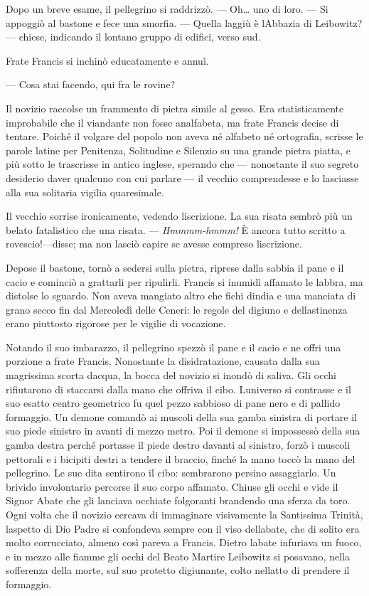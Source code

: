 Dopo un breve esame, il pellegrino si raddrizzò. --- Oh\ldots{} uno di
loro. --- Si appoggiò al bastone e fece una smorfia. --- Quella laggiù è
l\textquotesingle Abbazia di Leibowitz? --- chiese, indicando il lontano
gruppo di edifici, verso sud.

Frate Francis si inchinò educatamente e annuì.

--- Cosa stai facendo, qui fra le rovine?

Il novizio raccolse un frammento di pietra simile al gesso. Era
statisticamente improbabile che il viandante non fosse analfabeta, ma
frate Francis decise di tentare. Poiché il volgare del popolo non aveva
né alfabeto né ortografia, scrisse le parole latine per Penitenza,
Solitudine e Silenzio su una grande pietra piatta, e più sotto le
trascrisse in antico inglese, sperando che --- nonostante il suo segreto
desiderio d\textquotesingle aver qualcuno con cui parlare --- il vecchio
comprendesse e lo lasciasse alla sua solitaria vigilia quaresimale.

Il vecchio sorrise ironicamente, vedendo l\textquotesingle iscrizione.
La sua risata sembrò più un belato fatalistico che una risata. ---
\emph{Hmmmm-hmmm!} È ancora tutto scritto a rovescio!---disse; ma non
lasciò capire se avesse compreso l\textquotesingle iscrizione.

Depose il bastone, tornò a sedersi sulla pietra, riprese dalla sabbia il
pane e il cacio e cominciò a grattarli per ripulirli. Francis si inumidì
affamato le labbra, ma distolse lo sguardo. Non aveva mangiato altro che
fichi d\textquotesingle india e una manciata di grano secco fin dal
Mercoledì delle Ceneri: le regole del digiuno e
dell\textquotesingle astinenza erano piuttosto rigorose per le vigilie
di vocazione.

Notando il suo imbarazzo, il pellegrino spezzò il pane e il cacio e ne
offri una porzione a frate Francis. Nonostante la disidratazione,
causata dalla sua magrissima scorta d\textquotesingle acqua, la bocca
del novizio si inondò di saliva. Gli occhi rifiutarono di staccarsi
dalla mano che offriva il cibo. L\textquotesingle universo si contrasse
e il suo esatto centro geometrico fu quel pezzo sabbioso di pane nero e
di pallido formaggio. Un demone comandò ai muscoli della sua gamba
sinistra di portare il suo piede sinistro in avanti di mezzo metro. Poi
il demone si impossessò della sua gamba destra perché portasse il piede
destro davanti al sinistro, forzò i muscoli pettorali e i bicipiti
destri a tendere il braccio, finché la mano toccò la mano del
pellegrino. Le sue dita sentirono il cibo: sembrarono persino
assaggiarlo. Un brivido involontario percorse il suo corpo affamato.
Chiuse gli occhi e vide il Signor Abate che gli lanciava occhiate
folgoranti brandendo una sferza da toro. Ogni volta che il novizio
cercava di immaginare visivamente la Santissima Trinità,
l\textquotesingle aspetto di Dio Padre si confondeva sempre con il viso
dell\textquotesingle abate, che di solito era molto corrucciato, almeno
così pareva a Francis. Dietro l\textquotesingle abate infuriava un
fuoco, e in mezzo alle fiamme gli occhi del Beato Martire Leibowitz si
posavano, nella sofferenza della morte, sul suo protetto digiunante,
colto nell\textquotesingle atto di prendere il formaggio.

